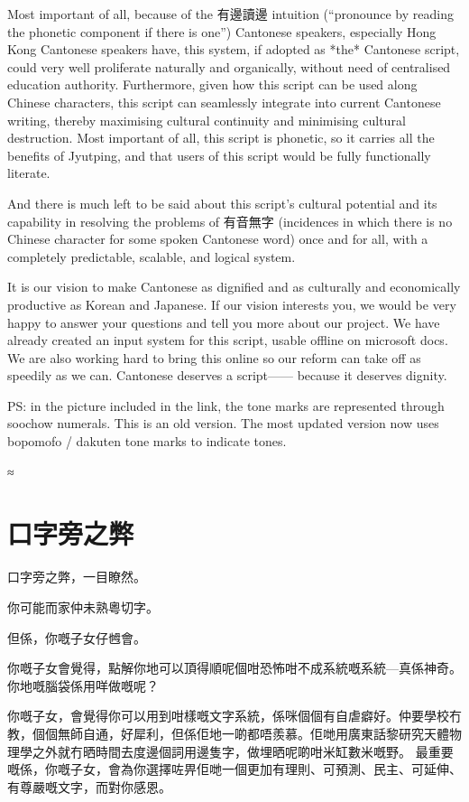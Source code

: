 \documentclass[a5paper, 10pt, openany]{book} %
\begin{document}
Most important of all, because of the 有邊讀邊 intuition (“pronounce by reading the phonetic component if there is one”) Cantonese speakers, especially Hong Kong Cantonese speakers have, this system, if adopted as *the* Cantonese script, could very well proliferate naturally and organically, without need of centralised education authority. Furthermore, given how this script can be used along Chinese characters, this script can seamlessly integrate into current Cantonese writing, thereby maximising cultural continuity and minimising cultural destruction. Most important of all, this script is phonetic, so it carries all the benefits of Jyutping, and that users of this script would be fully functionally literate.

And there is much left to be said about this script’s cultural potential and its capability in resolving the problems of 有音無字 (incidences in which there is no Chinese character for some spoken Cantonese word) once and for all, with a completely predictable, scalable, and logical system.

It is our vision to make Cantonese as dignified and as culturally and economically productive as Korean and Japanese. If our vision interests you, we would be very happy to answer your questions and tell you more about our project. We have already created an input system for this script, usable offline on microsoft docs. We are also working hard to bring this online so our reform can take off as speedily as we can. Cantonese deserves a script—— because it deserves dignity.

PS: in the picture included in the link, the tone marks are represented through soochow numerals. This is an old version. The most updated version now uses bopomofo / dakuten tone marks to indicate tones.

≈%


\chapter{口字旁之弊}
口字旁之弊，一目瞭然。

你可能而家仲未熟粵切字。

但係，你嘅子女仔乸會。

你嘅子女會覺得，點解你地可以頂得順呢個咁恐怖咁不成系統嘅系統—真係神奇。你地嘅腦袋係用咩做嘅呢？

你嘅子女，會覺得你可以用到咁樣嘅文字系統，係咪個個有自虐癖好。仲要學校冇教，個個無師自通，好犀利，但係佢地一啲都唔羨慕。佢哋用廣東話黎研究天體物理學之外就冇晒時間去度邊個詞用邊隻字，做埋晒呢啲咁米缸數米嘅野。
最重要嘅係，你嘅子女，會為你選擇咗畀佢哋一個更加有理則、可預測、民主、可延伸、有尊嚴嘅文字，而對你感恩。
\end{document}

